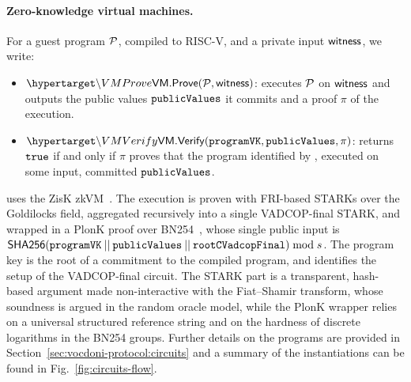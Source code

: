 \paragraph{Zero-knowledge virtual machines.} For a guest program $\mathcal{P}$, compiled to RISC-V, and a private input ${\sf{witness}}$, we write:
\begin{itemize}
	\item $\hlset{\VMProve}(\Prog, \witness)$: executes $\mathcal{P}$ on ${\sf{witness}}$ and outputs the public values $\texttt{publicValues}$ it commits and a proof $\pi$ of the execution.
	\item $\hlset{\VMVerify}(\programvk, \publicvalues, \pi)$: returns $\texttt{true}$ if and only if $\pi$ proves that the program identified by \programvk, executed on some input, committed $\texttt{publicValues}$.
\end{itemize}
\Davinci uses the ZisK \ac{zkVM}~\cite{zisk}. The execution is proven with FRI-based \acp{STARK} over the Goldilocks field, aggregated recursively into a single VADCOP-final \ac{STARK}, and wrapped in a PlonK proof over BN254~\cite{gabizon2019plonk}, whose single public input is ${\sf{SHA256}}(\texttt{programVK} \:||\: \texttt{publicValues} \:||\: \texttt{rootCVadcopFinal}) \bmod s$. The program key \programvk is the root of a commitment to the compiled program, and \rootc identifies the setup of the VADCOP-final circuit. The \ac{STARK} part is a transparent, hash-based argument made non-interactive with the Fiat--Shamir transform, whose soundness is argued in the random oracle model, while the PlonK wrapper relies on a universal structured reference string and on the hardness of discrete logarithms in the BN254 groups. Further details on the programs are provided in Section~\ref{sec:vocdoni-protocol:circuits} and a summary of the instantiations can be found in Fig.~\ref{fig:circuits-flow}.
